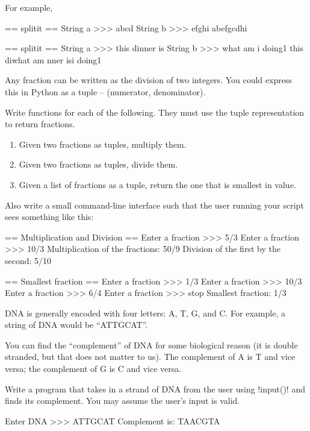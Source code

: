 \documentclass[11pt]{cselabheader}
\begin{document}
\begin{ex}[stringfun.py]
\begin{description}
  For example,

  \begin{verbatimcode}
== splitit ==
String a >>> abcd
String b >>> efghi
abefgcdhi
  \end{verbatimcode}

  \begin{verbatimcode}
== splitit ==
String a >>> this dinner is
String b >>> what am i doing1
this diwhat am nner isi doing1
  \end{verbatimcode}
\end{description}

\end{ex}

\begin{ex}[fractions.py] Any fraction can be written as the division of two
  integers. You could express this in Python as a tuple -- 
  (numerator, denominator).

  Write functions for each of the following. They must use the tuple
  representation to return fractions.
  \begin{enumerate}
    \item Given two fractions as tuples, multiply them.
    \item Given two fractions as tuples, divide them.
    \item Given a list of fractions as a tuple, return the one that is
      smallest in value.
  \end{enumerate}

  Also write a small command-line interface such that the user running your
  script sees something like this:

  \begin{verbatimcode}
== Multiplication and Division ==
Enter a fraction >>> 5/3
Enter a fraction >>> 10/3
Multiplication of the fractions: 50/9
Division of the first by the second: 5/10

== Smallest fraction ==
Enter a fraction >>> 1/3
Enter a fraction >>> 10/3
Enter a fraction >>> 6/4
Enter a fraction >>> stop
Smallest fraction: 1/3
  \end{verbatimcode}
\end{ex}

\begin{ex}[dna.py] 
  DNA is generally encoded with four letters: A, T, G, and C. For example, a
  string of DNA would be ``ATTGCAT''.

  You can find the ``complement'' of DNA for some biological reason (it is
  double stranded, but that does not matter to us). The complement of A is T
  and vice versa; the complement of G is C and vice versa.

  Write a program that takes in a strand of DNA from the user using
  \pythoninline!input()! and finds its complement. You may assume the user's
  input is valid.

  \begin{verbatimcode}
Enter DNA >>> ATTGCAT
Complement is: TAACGTA
\end{verbatimcode}
\end{ex}
\end{document}
